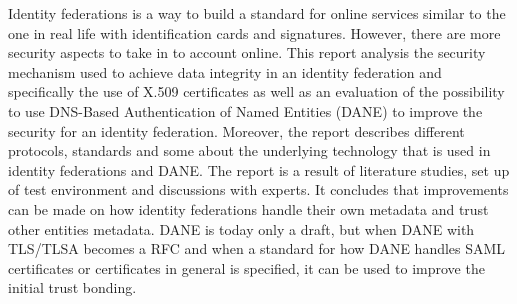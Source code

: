 Identity federations is a way to build a standard for online services similar to the one in real life with identification cards and signatures.
However, there are more security aspects to take in to account online.
This report analysis the security mechanism used to achieve data integrity in an identity federation and specifically the use of X.509 certificates as well as an evaluation of the possibility to use DNS-Based Authentication of Named Entities (DANE) to improve the security for an identity federation.
Moreover, the report describes different protocols, standards and some about the underlying technology that is used in identity federations and DANE. 
The report is a result of literature studies, set up of test environment and discussions with experts.
It concludes that improvements can be made on how identity federations handle their own metadata and trust other entities metadata. 
DANE is today only a draft, but when DANE with TLS/TLSA becomes a RFC and when a standard for how DANE handles SAML certificates
or certificates in general is specified, it can be used to improve the initial trust bonding.





